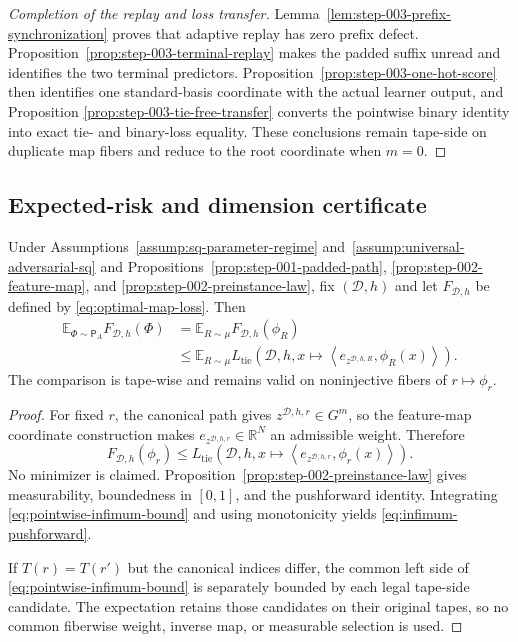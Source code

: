 \begin{proof}[Completion of the replay and loss transfer]
Lemma~\ref{lem:step-003-prefix-synchronization} proves that adaptive replay
has zero prefix defect.  Proposition~\ref{prop:step-003-terminal-replay}
makes the padded suffix unread and identifies the two terminal predictors.
Proposition~\ref{prop:step-003-one-hot-score} then identifies one
standard-basis coordinate with the actual learner output, and Proposition
\ref{prop:step-003-tie-free-transfer} converts the pointwise binary identity
into exact tie- and binary-loss equality.  These conclusions remain
tape-side on duplicate map fibers and reduce to the root coordinate when
\(m=0\).
\end{proof}

\subsection{Expected-risk and dimension certificate}\label{app:step-004}

\begin{proposition}
\label{prop:step-004-infimum-pushforward}
Under Assumptions~\ref{assump:sq-parameter-regime}
and~\ref{assump:universal-adversarial-sq} and
Propositions~\ref{prop:step-001-padded-path},
\ref{prop:step-002-feature-map}, and
\ref{prop:step-002-preinstance-law}, fix \((\mathcal D,h)\) and let
\(F_{\mathcal D,h}\) be defined by
\eqref{eq:optimal-map-loss}.  Then
\[
\begin{aligned}
\mathbb E_{\Phi\sim\mathsf P_A}F_{\mathcal D,h}(\Phi)
&=\mathbb E_{R\sim\mu}F_{\mathcal D,h}(\phi_R)\\
&\le\mathbb E_{R\sim\mu}
L_{\mathrm{tie}}\!\left(
\mathcal D,h,
x\mapsto\left\langle
e_{z^{\mathcal D,h,R}},\phi_R(x)
\right\rangle\right).
\end{aligned}
\tag{A.33}\label{eq:infimum-pushforward}
\]
The comparison is tape-wise and remains valid on noninjective fibers of
\(r\mapsto\phi_r\).
\end{proposition}

\begin{proof}
For fixed \(r\), the canonical path gives
\(z^{\mathcal D,h,r}\in G^m\), so the feature-map coordinate construction
makes \(e_{z^{\mathcal D,h,r}}\in\mathbb R^N\) an admissible weight.
Therefore
\[
F_{\mathcal D,h}(\phi_r)
\le L_{\mathrm{tie}}\!\left(
\mathcal D,h,
x\mapsto\left\langle e_{z^{\mathcal D,h,r}},\phi_r(x)\right\rangle
\right).
\tag{A.34}\label{eq:pointwise-infimum-bound}
\]
No minimizer is claimed.  Proposition~\ref{prop:step-002-preinstance-law}
gives measurability, boundedness in \([0,1]\), and the pushforward identity.
Integrating \eqref{eq:pointwise-infimum-bound} and using monotonicity yields
\eqref{eq:infimum-pushforward}.

If \(T(r)=T(r')\) but the canonical indices differ, the common left side of
\eqref{eq:pointwise-infimum-bound} is separately bounded by each legal
tape-side candidate.  The expectation retains those candidates on their
original tapes, so no common fiberwise weight, inverse map, or measurable
selection is used.
\end{proof}

